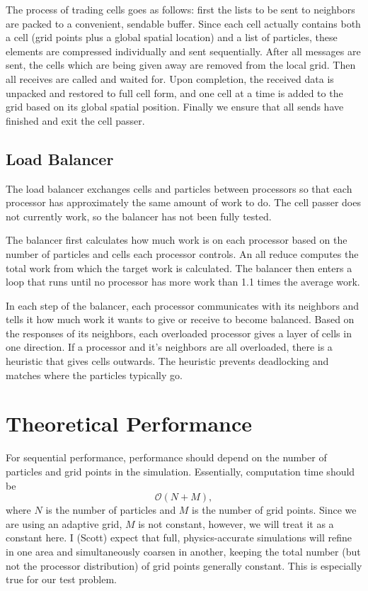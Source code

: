 \documentclass[]{article}
\begin{document}
The process of trading cells goes as follows: first the lists to be sent to neighbors are packed to a convenient, sendable buffer. Since each cell actually contains both a cell (grid points plus a global spatial location) and a list of particles, these elements are compressed individually and sent sequentially. After all messages are sent, the cells which are being given away are removed from the local grid. Then all receives are called and waited for. Upon completion, the received data is unpacked and restored to full cell form, and one cell at a time is added to the grid based on its global spatial position. %
Finally we ensure that all sends have finished and exit the cell passer.

\subsection{Load Balancer}
The load balancer exchanges cells and particles between processors so that each processor has approximately the same amount of work to do.  The cell passer does not currently work, so the balancer has not been fully tested.

The balancer first calculates how much work is on each processor based on the number of particles and cells each processor controls.  An all reduce computes the total work from which the target work is calculated.  The balancer then enters a loop that runs until no processor has more work than 1.1 times the average work.

In each step of the balancer, each processor communicates with its neighbors and tells it how much work it wants to give or receive to become balanced.  Based on the responses of its neighbors, each overloaded processor gives a layer of cells in one direction.  If a processor and it's neighbors are all overloaded, there is a heuristic that gives cells outwards.  The heuristic prevents deadlocking and matches where the particles typically go.


\section{Theoretical Performance}
For sequential performance, performance should depend on the number of particles and grid points in the simulation.  Essentially, computation time should be 
\begin{equation}
\mathcal{O}(N + M),
\end{equation}
where $N$ is the number of particles and $M$ is the number of grid points.  Since we are using an adaptive grid, $M$ is not constant, however, we will treat it as a constant here.  I (Scott) expect that full, physics-accurate simulations will refine in one area and simultaneously coarsen in another, keeping the total number (but not the processor distribution) of grid points generally constant.  This is especially true for our test problem.
\end{document}
